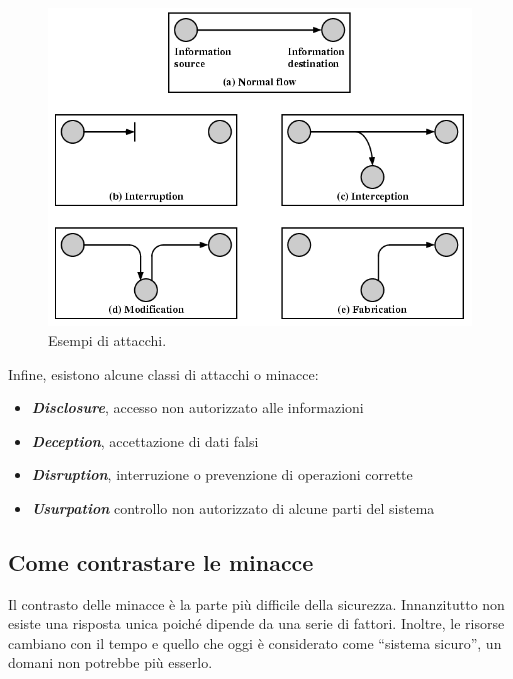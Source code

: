 \documentclass[a4paper]{article}
\newcommand{\dquotes}[1]{``#1''}
\begin{document}
	\begin{figure}[!htp]
		\centering
		\includegraphics[width=\textwidth]{img/sicurezza/sicurezza.png}
		\caption{Esempi di attacchi.}
	\end{figure}

	\noindent
	Infine, esistono alcune classi di attacchi o minacce:
	\begin{itemize}
		\item \textbf{\emph{Disclosure}}, accesso non autorizzato alle informazioni
		
		\item \textbf{\emph{Deception}}, accettazione di dati falsi
		
		\item \textbf{\emph{Disruption}}, interruzione o prevenzione di operazioni corrette
		
		\item \textbf{\emph{Usurpation}} controllo non autorizzato di alcune parti del sistema
	\end{itemize}\newpage

	\subsection{Come contrastare le minacce}\label{come contrastare le minacce}
	
	Il contrasto delle minacce è la parte più difficile della sicurezza. Innanzitutto non esiste una risposta unica poiché dipende da una serie di fattori. Inoltre, le risorse cambiano con il tempo e quello che oggi è considerato come \dquotes{sistema sicuro}, un domani non potrebbe più esserlo.\newline
	
\end{document}
